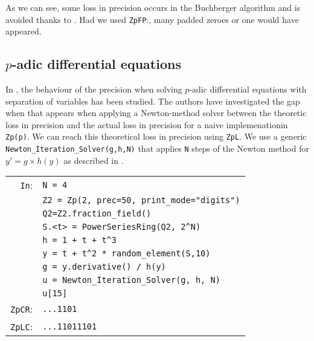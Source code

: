 \documentclass[sigconf]{acmart}
\newcommand{\ZpL}{\text{\rm \tt ZpL}\xspace}
\newcommand{\cIn}{{\color{blue} \tt \phantom{Zp}In}:}
\newcommand{\cZpCR}{{\color{red} \tt ZpCR}:}
\newcommand{\cZpFP}{{\color{red} \tt ZpFP}:}
\newcommand{\cZpLC}{{\color{red} \tt ZpLC}:}
\theoremstyle{definition}
\begin{document}
As we can see, some loss in precision occurs in the
Buchberger algorithm and is avoided thanks to \ZpL.
Had we used \cZpFP , many padded zeroes or one would have appeared.

\subsection{$p$-adic differential equations}


In \cite{LV16}, the behaviour of the precision when solving
$p$-adic differential equations with separation of 
variables has been studied.
The authors have investigated the gap when that appears
when applying a Newton-method solver between
the theoretic loss in precision and the 
actual loss in precision for a naive implemenationin \verb?Zp(p)?.
We can reach this theoretical loss in precision using \verb?ZpL?.
We use a generic \verb?Newton_Iteration_Solver(g,h,N)?
that applies \verb?N? steps of the Newton method for 
$y'=g \times h(y)$ as described in \citep{LV16}. 

\begin{tabular}{rl}
\cIn
 & \verb?N = 4? \\
 & \verb?Z2 = Zp(2, prec=50, print_mode="digits")? \\
 & \verb?Q2=Z2.fraction_field()? \\
 & \verb?S.<t> = PowerSeriesRing(Q2, 2^N)? \\
 & \verb?h = 1 + t + t^3? \\
 & \verb?y = t + t^2 * random_element(S,10)? \\
 & \verb?g = y.derivative() / h(y)? \\
 & \verb?u = Newton_Iteration_Solver(g, h, N)? \\
 & \verb?u[15]? \\
\cZpCR
 & \verb?...1101? \\
\cZpLC
 & \verb?...11011101? \\
\end{tabular}
\end{document}
